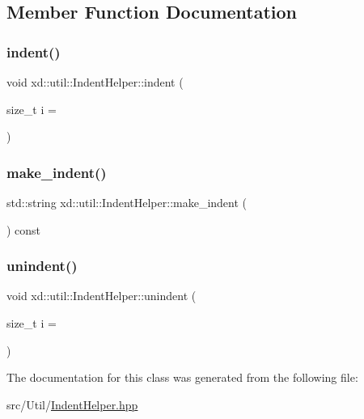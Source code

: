 \subsection{Member Function Documentation}
\mbox{\label{classxd_1_1util_1_1_indent_helper_a88bc31a52660ade954b728e981e2a03e}} 
\subsubsection{\texorpdfstring{indent()}{indent()}}
{\footnotesize\ttfamily void xd\+::util\+::\+Indent\+Helper\+::indent (\begin{DoxyParamCaption}\item[{size\+\_\+t}]{i = {} }\end{DoxyParamCaption})\hspace{0.3cm}{\ttfamily [inline]}}

\mbox{\label{classxd_1_1util_1_1_indent_helper_ad410eb0a0b1d6f18dbf38dc2dd33686f}} 
\subsubsection{\texorpdfstring{make\+\_\+indent()}{make\_indent()}}
{\footnotesize\ttfamily std\+::string xd\+::util\+::\+Indent\+Helper\+::make\+\_\+indent (\begin{DoxyParamCaption}{ }\end{DoxyParamCaption}) const\hspace{0.3cm}{\ttfamily [inline]}}

\mbox{\label{classxd_1_1util_1_1_indent_helper_a77dc7e1ba20b3145ed7bd7b73777741d}} 
\subsubsection{\texorpdfstring{unindent()}{unindent()}}
{\footnotesize\ttfamily void xd\+::util\+::\+Indent\+Helper\+::unindent (\begin{DoxyParamCaption}\item[{size\+\_\+t}]{i = {} }\end{DoxyParamCaption})\hspace{0.3cm}{\ttfamily [inline]}}



The documentation for this class was generated from the following file\+:\begin{DoxyCompactItemize}
\item 
src/\+Util/\mbox{\hyperlink{_indent_helper_8hpp}{Indent\+Helper.\+hpp}}\end{DoxyCompactItemize}
